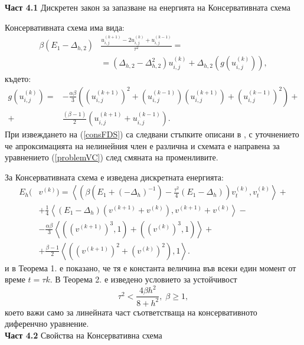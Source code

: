 \documentclass[a5paper]{article}
\newcommand{\be}{\begin{equation}}
\newcommand{\ee}{\end{equation}}
\newcommand{\rf}[1]{(\ref{#1})}
\theoremstyle{remark}
\begin{document}
\begin{large}
\textbf{Част 4.1} Дискретен закон за запазване на енергията на Консервативната схема

Консервативната схема има вида:
\begin{align}\label{consFDS}
\beta (E_1-\Delta_{h,2})&\frac{ u^{(k+1)}_{i, j} - 2u^{(k)}_{i,j} + u^{(k-1)}_{i,j} }{\tau^2} =  \nonumber \\
&=(\Delta_{h,2} - \Delta_{h,2}^2)u^{(k)}_{i,j} + \Delta_{h,2}(g(u^{(k)}_{i,j})),
\end{align}
където:
\begin{align}
g(u^{(k)}_{i,j})=& -\frac{\alpha \beta} { 3 } \left( (u^{(k+1)}_{i,j})^2 + (u^{(k-1)}_{i,j})(u^{(k+1)}_{i,j}) + (u^{(k-1)}_{i,j})^2 \right) + \nonumber\\
+&\frac{ (\beta - 1 )}{ 2 }\left( u^{(k+1)}_{i,j} + u^{(k-1)}_{i,j} \right).
\end{align}
При извеждането на \rf{consFDS} са следвани стъпките описани в \cite{ref25, ref999, ref1000}, с уточнението че апроксимацията на нелинейния член е различна и схемата е направена за уравнението \rf{problemVC} след смяната на променливите.

За Консервативната схема е изведена дискретната енергията:
\begin{align}\label{en_norm}
E_h(&v^{(k)})=\left< \left( \beta (E_1+(-\Delta_h)^{-1})- \frac{\tau^2}{4}( E_1-\Delta_h ) \right)v_{t}^{(k)} ,v_{t}^{(k)} \right>+ \nonumber\\
&+\frac{1}{4}  \left<  ( E_1-\Delta_h)(v^{(k+1)}+v^{(k)}), v^{(k+1)}+v^{(k)} \right> - \nonumber\\
&- \frac{\alpha \beta}{3} \left< ((v^{(k+1)})^3,1)+((v^{(k)})^3,1) \right> + \nonumber\\
&+\frac{\beta - 1}{2} \left< \left( (v^{(k+1)})^2+(v^{(k)})^2 \right), 1 \right>.
\end{align}
и в Теорема 1. е показано, че тя е константа величина във всеки един момент от време $t=\tau k$. В Теорема 2. е изведено условието за устойчивост
\be
\tau^2 < \frac{ 4 \beta h^2 } { 8 + h^2}, \; \beta \ge 1,
\ee 
което важи само за линейната част съответстваща на консервативното диференчно уравнение.
\\

\textbf{Част 4.2} Свойства на Консервативна схема


\end{large}
\end{document}
